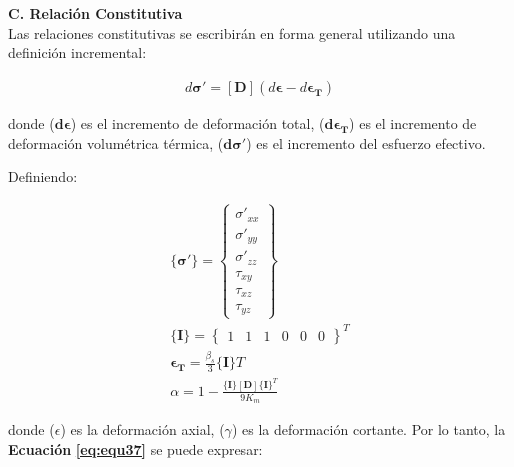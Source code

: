 \textbf{C. Relación Constitutiva}
\\
Las relaciones constitutivas se escribirán en forma general utilizando una definición incremental:
\begin{ceqn} 
\begin{gather} \label{eq:equ37} 
d\mathbf{\sigma}'=[\mathbf{D}] (d\mathbf{\epsilon} - d\mathbf{\epsilon_{T}})
\end{gather}  
\end{ceqn}
donde ($\mathbf{d\epsilon}$) es el incremento de deformación total, ($\mathbf{d\epsilon_{T}}$) es el incremento de deformación volumétrica térmica, ($\mathbf{d\sigma'}$) es el incremento del esfuerzo efectivo.

Definiendo:

\begin{ceqn} 
\begin{subequations} \label{eq:equ38} 
\begin{gather}
\{\mathbf{\sigma'}\} = 
       \begin{Bmatrix} 
       \sigma'_{xx}\\[3pt]
       \sigma'_{yy}\\[3pt]
       \sigma'_{zz}\\[3pt]
       \tau_{xy}\\[3pt]
       \tau_{xz}\\[3pt]
       \tau_{yz}
       \end{Bmatrix} 
       \label{eq:equ38a} \\[5pt]
\{\mathbf{I}\} = 
      \begin{Bmatrix}
       1 & 1 & 1 & 0 & 0 & 0
       \end{Bmatrix} ^T
       \label{eq:equ38b} \\[10pt]
\mathbf{\epsilon_{T}} = \frac{\beta_s}{3}\{\mathbf{I}\}T
       \label{eq:equ38c} \\[5pt]
\alpha = 1 - \frac{\{\mathbf{I}\}[\mathbf{D}]\{\mathbf{I}\}^T}{9K_m}
       \label{eq:equ38d}
\end{gather}  
\end{subequations} 
\end{ceqn}
donde ($\epsilon$) es la deformación axial, ($\gamma$) es la deformación cortante. Por lo tanto, la \textbf{Ecuación} \textbf{\ref{eq:equ37}} se puede expresar:

